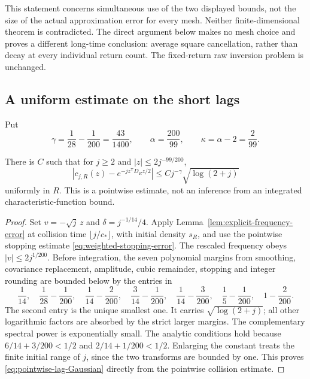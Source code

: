 This statement concerns simultaneous use of the two displayed bounds,
not the size of the actual approximation error for every mesh. Neither
finite-dimensional theorem is contradicted. The direct argument below
makes no mesh choice and proves a different long-time conclusion:
average square cancellation, rather than decay at every individual
return count. The fixed-return raw inversion problem is unchanged.

\subsection{A uniform estimate on the short lags}
Put
\begin{equation}\label{eq:direct-exponent-definitions}
 \gamma=\frac1{28}-\frac1{200}=\frac{43}{1400},\qquad
 \alpha=\frac{200}{99},\qquad \kappa=\alpha-2=\frac2{99}.
\end{equation}

\begin{lemma}
\label{lem:pointwise-lag-Gaussian}
There is $C$ such that for $j\ge2$ and $|z|\le2j^{-99/200}$,
\begin{equation}\label{eq:pointwise-lag-Gaussian}
 \left|c_{j,R}(z)-e^{-jz^{\mathsf T}D_Rz/2}\right|
             \le Cj^{-\gamma}\sqrt{\log(2+j)}
\end{equation}
uniformly in $R$. This is a pointwise estimate, not an inference from
an integrated characteristic-function bound.
\end{lemma}
\begin{proof}
Set $v=-\sqrt j\,z$ and $\delta=j^{-1/14}/4$. Apply
Lemma~\ref{lem:explicit-frequency-error} at collision time
$\lfloor j/c_*\rfloor$, with initial density $s_R$, and use the
pointwise stopping estimate \eqref{eq:weighted-stopping-error}.
The rescaled frequency obeys $|v|\le2j^{1/200}$. Before integration,
the seven polynomial margins from smoothing, covariance replacement,
amplitude, cubic remainder, stopping and integer rounding are bounded
below by the entries in
\[
 \frac1{14},\quad\frac1{28}-\frac1{200},\quad
 \frac1{14}-\frac2{200},\quad\frac3{14}-\frac1{200},\quad
 \frac1{14}-\frac3{200},\quad\frac15-\frac1{200},\quad
 1-\frac2{200}.
\]
The second entry is the unique smallest one. It carries
$\sqrt{\log(2+j)}$; all other logarithmic factors are absorbed by
the strict larger margins. The complementary spectral power is
exponentially small. The analytic conditions hold because
$6/14+3/200<1/2$ and $2/14+1/200<1/2$. Enlarging the constant treats
the finite initial range of $j$, since the two transforms are bounded
by one. This proves \eqref{eq:pointwise-lag-Gaussian} directly from the
pointwise collision estimate.
\end{proof}

